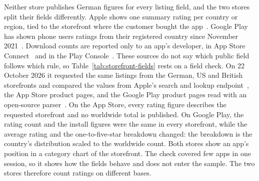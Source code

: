 Neither store publishes German figures for every listing field, and the two
stores split their fields differently. Apple shows one summary rating per
country or region, tied to the storefront where the customer bought the
app~\parencite{apple2026ratingsoverview}. Google Play has shown phone users
ratings from their registered country since November
2021~\parencite{grinsted2021making}. Download counts are reported only to an
app's developer, in App Store Connect~\parencite{apple2026acquisition} and in the
Play Console~\parencite{google2026playstatistics}. These sources do not say
which public field follows which rule, so Table~\ref{tab:storefront-fields}
rests on a field check. On 22 October 2026 it requested the same listings from
the German, US and British storefronts and compared the values from Apple's
search and lookup endpoint~\parencite{apple2022itunessearch}, the App Store
product pages, and the Google Play product pages read with an open-source
parser~\parencite{jomingyu2024googleplayscraper}. On the App Store, every rating
figure describes the requested storefront and no worldwide total is published.
On Google Play, the rating count and the install figures were the same in every
storefront, while the average rating and the one-to-five-star breakdown
changed: the breakdown is the country's distribution scaled to the worldwide
count. Both stores show an app's position in a category chart of the
storefront. The check covered few apps in one session, so it shows how the
fields behave and does not enter the sample. The two stores therefore count
ratings on different bases.

